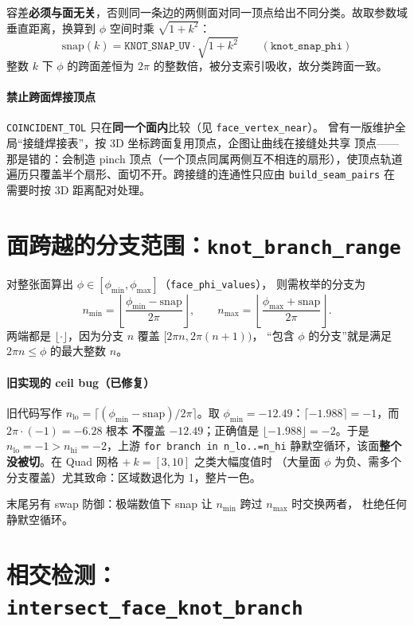 \documentclass{article}
\begin{document}
容差\textbf{必须与面无关}，否则同一条边的两侧面对同一顶点给出不同分类。故取参数域
垂直距离，换算到 $\phi$ 空间时乘 $\sqrt{1+k^2}$：
\[
\mathrm{snap}(k) = \mathtt{KNOT\_SNAP\_UV}\cdot\sqrt{1+k^2}
\qquad(\texttt{knot\_snap\_phi})
\]
整数 $k$ 下 $\phi$ 的跨面差恒为 $2\pi$ 的整数倍，被分支索引吸收，故分类跨面一致。

\paragraph{禁止跨面焊接顶点}
\texttt{COINCIDENT\_TOL} 只在\textbf{同一个面内}比较（见 \texttt{face\_vertex\_near}）。
曾有一版维护全局“接缝焊接表”，按 3D 坐标跨面复用顶点，企图让曲线在接缝处共享
顶点——那是错的：会制造 pinch 顶点（一个顶点同属两侧互不相连的扇形），使顶点轨道
遍历只覆盖半个扇形、面切不开。跨接缝的连通性只应由 \texttt{build\_seam\_pairs} 在
需要时按 3D 距离配对处理。

\section{面跨越的分支范围：\texttt{knot\_branch\_range}}
\label{sec:branchrange}

对整张面算出 $\phi\in[\phi_{\min},\phi_{\max}]$（\texttt{face\_phi\_values}），
则需枚举的分支为
\[
n_{\min} = \left\lfloor \frac{\phi_{\min}-\mathrm{snap}}{2\pi} \right\rfloor,
\qquad
n_{\max} = \left\lfloor \frac{\phi_{\max}+\mathrm{snap}}{2\pi} \right\rfloor .
\]
两端都是 $\lfloor\cdot\rfloor$，因为分支 $n$ 覆盖 $[2\pi n, 2\pi(n+1))$，
“包含 $\phi$ 的分支”就是满足 $2\pi n\le\phi$ 的最大整数 $n$。

\paragraph{旧实现的 ceil bug（已修复）}
旧代码写作 $n_{\mathrm{lo}}=\lceil(\phi_{\min}-\mathrm{snap})/2\pi\rceil$。取
$\phi_{\min}=-12.49$：$\lceil-1.988\rceil=-1$，而 $2\pi\cdot(-1)=-6.28$ 根本
\textbf{不}覆盖 $-12.49$；正确值是 $\lfloor-1.988\rfloor=-2$。于是
$n_{\mathrm{lo}}=-1>n_{\mathrm{hi}}=-2$，上游 \texttt{for branch in n\_lo..=n\_hi}
静默空循环，该面\textbf{整个没被切}。在 Quad 网格 $+\ k=[3,10]$ 之类大幅度值时
（大量面 $\phi$ 为负、需多个分支覆盖）尤其致命：区域数退化为 1，整片一色。

末尾另有 swap 防御：极端数值下 snap 让 $n_{\min}$ 跨过 $n_{\max}$ 时交换两者，
杜绝任何静默空循环。

\section{相交检测：\texttt{intersect\_face\_knot\_branch}}
\end{document}
